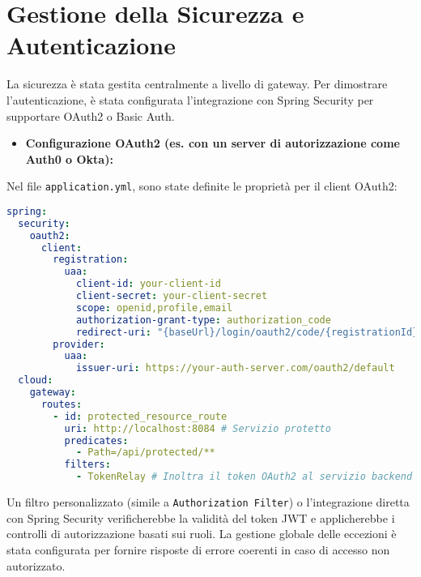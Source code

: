 \section{Gestione della Sicurezza e Autenticazione}
La sicurezza è stata gestita centralmente a livello di gateway. Per dimostrare l'autenticazione, è stata configurata l'integrazione con Spring Security per supportare OAuth2 o Basic Auth.
\begin{itemize}
    \item \textbf{Configurazione OAuth2 (es. con un server di autorizzazione come Auth0 o Okta):}
\end{itemize}
Nel file \texttt{application.yml}, sono state definite le proprietà per il client OAuth2:
\begin{lstlisting}[language=yaml, caption=Configurazione YAML per OAuth2 client]
spring:
  security:
    oauth2:
      client:
        registration:
          uaa:
            client-id: your-client-id
            client-secret: your-client-secret
            scope: openid,profile,email
            authorization-grant-type: authorization_code
            redirect-uri: "{baseUrl}/login/oauth2/code/{registrationId}"
        provider:
          uaa:
            issuer-uri: https://your-auth-server.com/oauth2/default
  cloud:
    gateway:
      routes:
        - id: protected_resource_route
          uri: http://localhost:8084 # Servizio protetto
          predicates:
            - Path=/api/protected/**
          filters:
            - TokenRelay # Inoltra il token OAuth2 al servizio backend
\end{lstlisting}
Un filtro personalizzato (simile a \texttt{Authorization Filter}) o l'integrazione diretta con Spring Security verificherebbe la validità del token JWT e applicherebbe i controlli di autorizzazione basati sui ruoli. La gestione globale delle eccezioni è stata configurata per fornire risposte di errore coerenti in caso di accesso non autorizzato.

